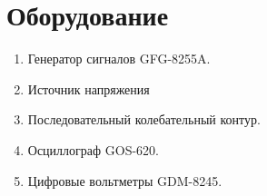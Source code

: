 \section*{Оборудование}

\begin{enumerate}
	\item Генератор сигналов GFG-8255A.
	
	\item Источник напряжения
	
	\item Последовательный колебательный контур.
	
	\item Осциллограф GOS-620.
	
	\item Цифровые вольтметры GDM-8245.
\end{enumerate}